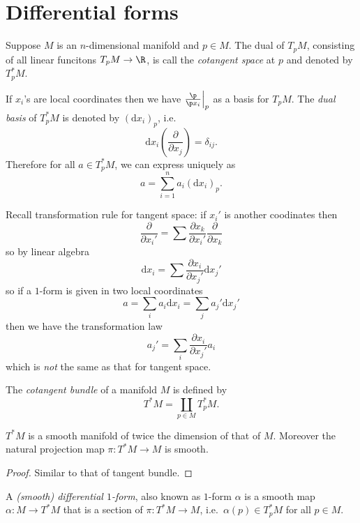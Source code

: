 \documentclass[a4paper]{article}
\begin{document}
\section{Differential forms}

\begin{definition}
  Suppose \(M\) is an \(n\)-dimensional manifold and \(p \in M\). The dual of \(T_pM\), consisting of all linear funcitons \(T_pM \to \R\), is call the \emph{cotangent space} at \(p\) and denoted by \(T_p^*M\).
\end{definition}
If \(x_i\)'s are local coordinates then we have \(\frac{\p}{\p x_i}\Big|_p\) as a basis for \(T_pM\). The \emph{dual basis} of \(T_p^*M\) is denoted by \((\mathrm d x_i)_p\), i.e.
\[
  \mathrm dx_i(\frac{\partial  }{\partial x_j}) = \delta_{ij}.
\]
Therefore for all \(a \in T_p^*M\), we can express uniquely as
\[
  a = \sum_{i = 1}^n a_i (\mathrm dx_i)_p.
\]

Recall transformation rule for tangent space: if \(x_i'\) is another coodinates then
\[
  \frac{\partial  }{\partial x_i'} = \sum \frac{\partial x_k}{\partial x_i'} \frac{\partial  }{\partial x_k}
\]
so by linear algebra
\[
  \mathrm dx_i = \sum \frac{\partial x_i}{\partial x_j'} \mathrm d x_j'
\]
so if a \(1\)-form is given in two local coordinates
\[
  a = \sum_i a_i \mathrm dx_i = \sum_j a_j' \mathrm dx_j'
\]
then we have the transformation law
\[
  a_j' = \sum_i \frac{\partial x_i}{\partial x_j'} a_i
\]
which is \emph{not} the same as that for tangent space.

\begin{definition}
  The \emph{cotangent bundle} of a manifold \(M\) is defined by
  \[
    T^*M = \coprod_{p \in M} T^*_pM.
  \]
\end{definition}

\begin{theorem}
  \(T^*M\) is a smooth manifold of twice the dimension of that of \(M\). Moreover the natural projection map \(\pi: T^*M \to M\) is smooth.
\end{theorem}

\begin{proof}
  Similar to that of tangent bundle.
\end{proof}

\begin{definition}
  A \emph{(smooth) differential \(1\)-form}, also known as \(1\)-form \(\alpha\) is a smooth map \(\alpha: M \to T^*M\) that is a section of \(\pi: T^*M \to M\), i.e.\ \(\alpha(p) \in T_p^*M\) for all \(p \in M\).
\end{definition}
\end{document}
